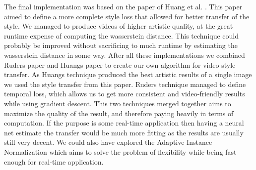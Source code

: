 The final implementation was based on the paper of Huang et al. \cite{Huang:1}. This paper aimed to define a more complete style loss that allowed for better transfer of the style. We managed to produce videos of higher artistic quality, at the great runtime expense of computing the wasserstein distance. This technique could probably be improved without sacrificing to much runtime by estimating the wasserstein distance in some way. \newline\newline
After all these implementations we combined Ruders paper \cite{Ruder:1} and Huangs paper \cite{Huang:1} to create our own algorithm for video style transfer. As Huangs technique produced the best artistic results of a single image we used the style transfer from this paper. Ruders technique managed to define temporal loss, which allows us to get more consistent and video-friendly results while using gradient descent. This two techniques merged together aims to maximize the quality of the result, and therefore paying heavily in terms of computation. If the purpose is some real-time application then having a neural net estimate the transfer would be much more fitting as the results are usually still very decent. We could also have explored the Adaptive Instance Normalization \cite{Huang:2} which aims to solve the problem of flexibility while being fast enough for real-time application.
\newpage